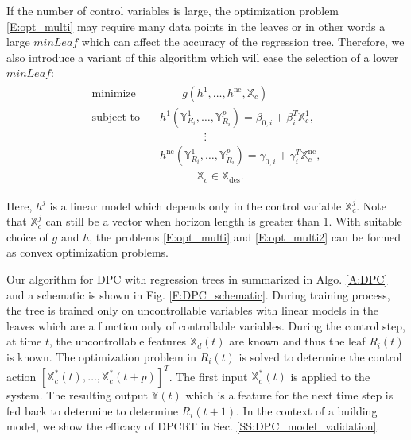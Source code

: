 If the number of control variables is large, the optimization problem \eqref{E:opt_multi} may require many data points in the leaves or in other words a large $minLeaf$ which can affect the accuracy of the regression tree. 
Therefore, we also introduce a variant of this algorithm which will ease the selection of a lower $minLeaf$:
\begin{align}
\begin{aligned}
\text{minimize } \ \ \ & \ \ \ \ \ \ \ \ \ \mathit{g} \left( h^1, \dots, h^{\mathrm{nc}}, \mathbb{X}_c  \right) \\ \text{subject to } \ \ \ & \mathit{h}^1 \left( \mathbb{Y}_{R_i}^1, \dots, \mathbb{Y}_{R_i}^p \right) = \beta_{0,i} + \beta^T_i \mathbb{X}_c^1, \\ \ \ \ & \ \ \ \ \ \ \ \ \ \ \ \ \ \ \ \ \ \ \vdots \\ \ \ \ & \mathit{h}^{\mathrm{nc}} \left( \mathbb{Y}_{R_i}^1, \dots, \mathbb{Y}_{R_i}^p \right) = \gamma_{0,i} + \gamma^T_i \mathbb{X}_c^{\mathrm{nc}}, \\ \ \ \ & \ \ \ \ \ \ \ \ \ \ \ \ \ \ \ \mathbb{X}_c \in \mathbb{X}_{\mathrm{des}}.
  \end{aligned}
  \label{E:opt_multi2}
\end{align}


Here, $h^j$ is a linear model which depends only in the control variable $\mathbb{X}_c^j$. Note that $\mathbb{X}_c^j$ can still be a vector when horizon length is greater than 1. With suitable choice of $g$ and $h$, the problems \eqref{E:opt_multi} and \eqref{E:opt_multi2} can be formed as convex optimization problems. 

Our algorithm for DPC with regression trees in summarized in Algo. \ref{A:DPC} and a schematic is shown in Fig. \ref{F:DPC_schematic}. During training process, the tree is trained only on uncontrollable variables with linear models in the leaves which are a function only of controllable variables. During the control step, at time $t$, the uncontrollable features $\mathbb{X}_d(t)$ are known and thus the leaf $R_{i}(t)$ is known. The optimization problem in $R_i(t)$ is solved to determine the control action $\left[\mathbb{X}^*_c(t),\dots,\mathbb{X}^*_c(t+p)\right]^T $. The first input $\mathbb{X}^*_c(t)$ is applied to the system. The resulting output $\mathbb{Y}(t)$ which is a feature for the next time step is fed back to determine to determine $R_{i}(t+1)$.
In the context of a building model, we show the efficacy of DPCRT in Sec. \ref{SS:DPC_model_validation}.

